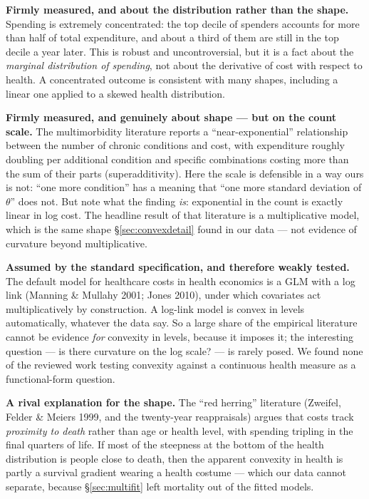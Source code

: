 \documentclass[11pt]{article}
\begin{document}
\textbf{Firmly measured, and about the distribution rather than the shape.}
Spending is extremely concentrated: the top decile of spenders accounts for
more than half of total expenditure, and about a third of them are still in
the top decile a year later. This is robust and uncontroversial, but it is a
fact about the \emph{marginal distribution of spending}, not about the
derivative of cost with respect to health. A concentrated outcome is
consistent with many shapes, including a linear one applied to a skewed
health distribution.

\textbf{Firmly measured, and genuinely about shape --- but on the count
scale.} The multimorbidity literature reports a ``near-exponential''
relationship between the number of chronic conditions and cost, with
expenditure roughly doubling per additional condition and specific
combinations costing more than the sum of their parts (superadditivity).
Here the scale is defensible in a way ours is not: ``one more condition'' has
a meaning that ``one more standard deviation of $\theta$'' does not. But note
what the finding \emph{is}: exponential in the count is exactly linear in log
cost. The headline result of that literature is a multiplicative model, which
is the same shape \S\ref{sec:convexdetail} found in our data --- not evidence
of curvature beyond multiplicative.

\textbf{Assumed by the standard specification, and therefore weakly tested.}
The default model for healthcare costs in health economics is a GLM with a
log link (Manning \& Mullahy 2001; Jones 2010), under which covariates act
multiplicatively by construction. A log-link model is convex in levels
automatically, whatever the data say. So a large share of the empirical
literature cannot be evidence \emph{for} convexity in levels, because it
imposes it; the interesting question --- is there curvature on the log scale?
--- is rarely posed. We found none of the reviewed work testing convexity
against a continuous health measure as a functional-form question.

\textbf{A rival explanation for the shape.} The ``red herring'' literature
(Zweifel, Felder \& Meiers 1999, and the twenty-year reappraisals) argues
that costs track \emph{proximity to death} rather than age or health level,
with spending tripling in the final quarters of life. If most of the
steepness at the bottom of the health distribution is people close to death,
then the apparent convexity in health is partly a survival gradient wearing a
health costume --- which our data cannot separate, because \S\ref{sec:multifit}
left mortality out of the fitted models.
\end{document}
